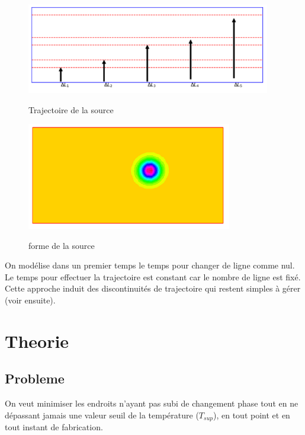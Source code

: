 \documentclass[11pt,a4paper]{article}
\begin{document}
\begin{figure}[H]
	\begin{minipage}{0.48\textwidth}
		\label{fig:trajectoire}
		\centering
		\includegraphics[width=0.95\textwidth]{trajectoire}
		\caption{Trajectoire de la source}
	\end{minipage}
	\begin{minipage}{0.48\textwidth}
		\label{fig:source}
		\centering
		\includegraphics[width=0.8\textwidth]{source}
		\caption{forme de la source}
	\end{minipage}
\end{figure}

On modélise dans un premier temps le temps pour changer de ligne comme nul. Le temps pour effectuer la trajectoire est constant car le nombre de ligne est fixé.
Cette approche induit des discontinuités de trajectoire qui restent simples à gérer (voir ensuite).


\section*{Theorie}
\subsection*{Probleme}

On veut minimiser les endroits n'ayant pas subi de changement phase tout en ne dépassant jamais une valeur seuil de la température ($T_{sup}$), en tout point et en tout instant de fabrication.
\end{document}
